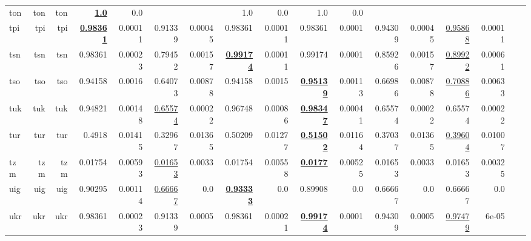 \documentclass[11pt]{article}
\begin{document}
\begin{table*}[h]
{\begin{tabular}{lrrrrrrrrrrrrrrrr}
ton         & ton         & ton         & \textbf{\underline{1.0}}         & 0.0         &          &          & 1.0         & 0.0         & 1.0         & 0.0         &          &          &          &          \\
tpi         & tpi         & tpi         & \textbf{\underline{0.98361}}         & 0.00011         & 0.91339         & 0.00045         & 0.98361         & 0.00011         & 0.98361         & 0.0001         & 0.94309         & 0.00045         & \underline{0.95868}         & 0.00011         \\
tsn         & tsn         & tsn         & 0.98361         & 0.00023         & 0.79452         & 0.00157         & \textbf{\underline{0.99174}}         & 0.00011         & 0.99174         & 0.0001         & 0.85926         & 0.00157         & \underline{0.89922}         & 0.00061         \\
tso         & tso         & tso         & 0.94158         & 0.0016         & 0.64073         & 0.00878         & 0.94158         & 0.0015         & \textbf{\underline{0.95139}}         & 0.00113         & 0.66986         & 0.00878         & \underline{0.70886}         & 0.00633         \\
tuk         & tuk         & tuk         & 0.94821         & 0.00148         & \underline{0.65574}         & 0.00022         & 0.96748         & 0.00086         & \textbf{\underline{0.98347}}         & 0.00041         & 0.65574         & 0.00022         & 0.65574         & 0.00022         \\
tur         & tur         & tur         & 0.4918         & 0.01415         & 0.32967         & 0.01365         & 0.50209         & 0.01277         & \textbf{\underline{0.51502}}         & 0.01164         & 0.37037         & 0.01365         & \underline{0.39604}         & 0.01007         \\
tzm         & tzm         & tzm         & 0.01754         & 0.00593         & \underline{0.01653}         & 0.0033         & 0.01754         & 0.00558         & \textbf{\underline{0.0177}}         & 0.00525         & 0.01653         & 0.0033         & 0.01653         & 0.00325         \\
uig         & uig         & uig         & 0.90295         & 0.00114         & \underline{0.66667}         & 0.0         & \textbf{\underline{0.93333}}         & 0.0         & 0.89908         & 0.0         & 0.66667         & 0.0         & 0.66667         & 0.0         \\
ukr         & ukr         & ukr         & 0.98361         & 0.00023         & 0.91339         & 0.0005         & 0.98361         & 0.00021         & \textbf{\underline{0.99174}}         & 0.0001         & 0.94309         & 0.0005         & \underline{0.97479}         & 6e-05         \\

\end{tabular}}
\end{table*}
\end{document}
